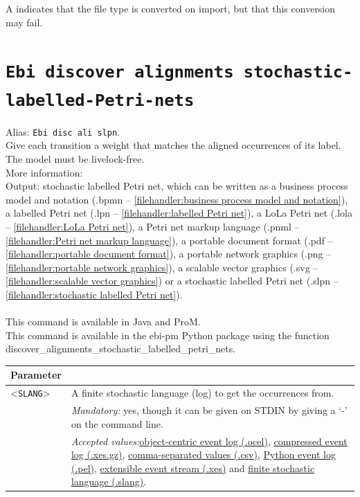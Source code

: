 {\begin{tabularx}{\linewidth}{lX}
\bottomrule
\end{tabularx}
A \textdagger{} indicates that the file type is converted on import, but that this conversion may fail.
\clearpage\section{\texttt{Ebi discover alignments stochastic-labelled-Petri-nets}}
\label{command:Ebi discover alignments stochastic-labelled-Petri-nets}
Alias: \texttt{Ebi disc ali slpn}.\\
Give each transition a weight that matches the aligned occurrences of its label. The model must be livelock-free.\\
More information: ~\cite{DBLP:conf/icpm/BurkeLW20}~\\
\noindent Output: stochastic labelled Petri net, which can be written as a business process model and notation (.bpmn -- \cref{filehandler:business process model and notation}), a labelled Petri net (.lpn -- \cref{filehandler:labelled Petri net}), a LoLa Petri net (.lola -- \cref{filehandler:LoLa Petri net}), a Petri net markup language (.pnml -- \cref{filehandler:Petri net markup language}), a portable document format (.pdf -- \cref{filehandler:portable document format}), a portable network graphics (.png -- \cref{filehandler:portable network graphics}), a scalable vector graphics (.svg -- \cref{filehandler:scalable vector graphics}) or a stochastic labelled Petri net (.slpn -- \cref{filehandler:stochastic labelled Petri net}).\\
\\This command is available in Java and ProM.
\\This command is available in the ebi-pm Python package using the function discover\_alignments\_stochastic\_labelled\_petri\_nets.
\begin{tabularx}{\linewidth}{lX}
\toprule
Parameter \\\midrule
<\texttt{SLANG}>&A finite stochastic language (log) to get the occurrences from.\\
&\textit{Mandatory:} \quad yes, though it can be given on STDIN by giving a `-' on the command line.\\
&\textit{Accepted values:}\quad \hyperref[filehandler:object-centric event log]{object-centric event log (.ocel)}, \hyperref[filehandler:compressed event log]{compressed event log (.xes.gz)}, \hyperref[filehandler:comma-separated values]{comma-separated values (.csv)}, \hyperref[filehandler:Python event log]{Python event log (.pel)}, \hyperref[filehandler:extensible event stream]{extensible event stream (.xes)} and \hyperref[filehandler:finite stochastic language]{finite stochastic language (.slang)}.\\

\end{tabularx}}
